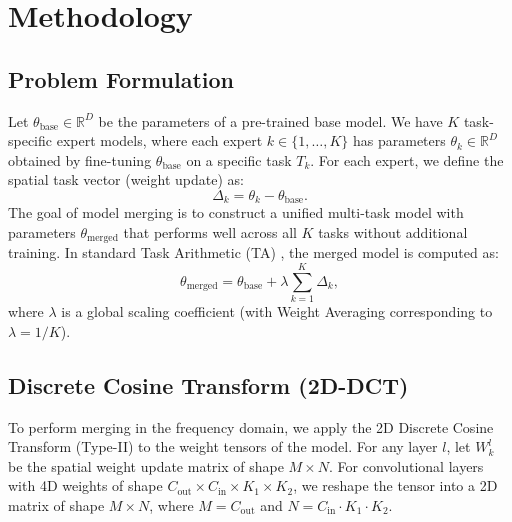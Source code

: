 \documentclass{article}
\theoremstyle{plain}
\theoremstyle{definition}
\theoremstyle{remark}
\begin{document}
\section{Methodology}
\label{sec:method}
\subsection{Problem Formulation}
Let $\theta_{\text{base}} \in \mathbb{R}^D$ be the parameters of a pre-trained base model. We have $K$ task-specific expert models, where each expert $k \in \{1, \dots, K\}$ has parameters $\theta_k \in \mathbb{R}^D$ obtained by fine-tuning $\theta_{\text{base}}$ on a specific task $T_k$. For each expert, we define the spatial task vector (weight update) as:
\begin{equation}
    \Delta_k = \theta_k - \theta_{\text{base}}.
\end{equation}
The goal of model merging is to construct a unified multi-task model with parameters $\theta_{\text{merged}}$ that performs well across all $K$ tasks without additional training. In standard Task Arithmetic (TA) \cite{ilharco2022editing}, the merged model is computed as:
\begin{equation}
    \theta_{\text{merged}} = \theta_{\text{base}} + \lambda \sum_{k=1}^K \Delta_k,
\end{equation}
where $\lambda$ is a global scaling coefficient (with Weight Averaging corresponding to $\lambda = 1/K$).

\subsection{Discrete Cosine Transform (2D-DCT)}
To perform merging in the frequency domain, we apply the 2D Discrete Cosine Transform (Type-II) to the weight tensors of the model. For any layer $l$, let $W_k^l$ be the spatial weight update matrix of shape $M \times N$. For convolutional layers with 4D weights of shape $C_{\text{out}} \times C_{\text{in}} \times K_1 \times K_2$, we reshape the tensor into a 2D matrix of shape $M \times N$, where $M = C_{\text{out}}$ and $N = C_{\text{in}} \cdot K_1 \cdot K_2$.
\end{document}
